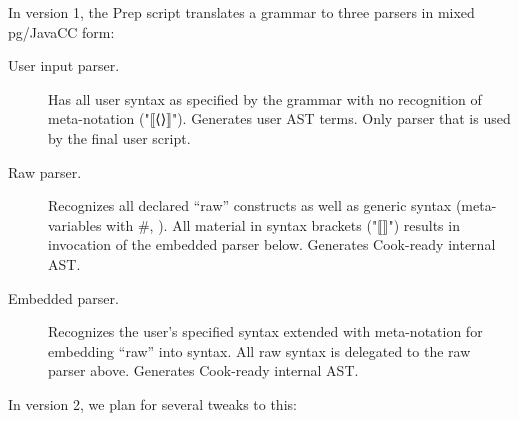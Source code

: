 \documentclass[11pt]{article} %
\begin{document}
In version 1, the Prep script translates a grammar to three parsers in mixed pg/JavaCC form:
\begin{description}

\item[User input parser.] Has all user syntax as specified by the grammar with no recognition of
  \HAX meta-notation ("⟦⟨⟩⟧"). Generates user AST terms. Only parser that is used by the final
  user script.

\item[Raw parser.] Recognizes all declared ``raw'' constructs as well as generic \HAX syntax
  (meta-variables with \#, \etc). All material in syntax brackets ("⟦⟧") results in invocation of
  the embedded parser below. Generates Cook-ready internal \HAX AST.

\item[Embedded parser.] Recognizes the user's specified syntax extended with \HAX meta-notation for
  embedding ``raw'' \HAX into syntax. All raw syntax is delegated to the raw parser above. Generates
  Cook-ready internal \HAX AST.

\end{description}
In version 2, we plan for several tweaks to this:
\end{document}
